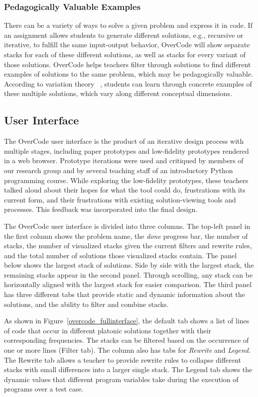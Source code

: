 \subsubsection{Pedagogically Valuable Examples} 
There can be a variety of ways to solve a given problem and express it in code. If an assignment allows students to generate different solutions, e.g., recursive or iterative, to fulfill the same input-output behavior, OverCode will show separate stacks for each of these different solutions, as well as stacks for every variant of those solutions. OverCode helps teachers filter through solutions to find different examples of solutions to the same problem, which may be pedagogically valuable. According to variation theory ~\cite{marton13}, students can learn through concrete examples of these multiple solutions, which vary along different conceptual dimensions.
\subsection{User Interface}

The OverCode user interface is the product of an iterative design process with multiple stages, including paper prototypes and low-fidelity prototypes rendered in a web browser.  Prototype iterations were used and critiqued by members of our research group and by several teaching staff of an introductory Python programming course. While exploring the low-fidelity prototypes, these teachers talked aloud about their hopes for what the tool could do, frustrations with its current form, and their frustrations with existing solution-viewing tools and processes. This feedback was incorporated into the final design.

The OverCode user interface is divided into three columns. The top-left panel in the first column shows the problem name, the \emph{done} progress bar, the number of stacks, the number of visualized stacks given the current filters and rewrite rules, and the total number of solutions those visualized stacks contain. The panel below shows the largest stack of solutions. Side by side with the largest stack, the remaining stacks appear in the second panel. Through scrolling, any stack can be horizontally aligned with the largest stack for easier comparison. The third panel has three different tabs that provide static and dynamic information about the solutions, and the ability to filter and combine stacks. 

As shown in Figure~\ref{overcode_fullinterface}, the default tab shows a list of lines of code that occur in different platonic solutions together with their corresponding frequencies. The stacks can be filtered based on the occurrence of one or more lines (Filter tab). The column also has tabs for \emph{Rewrite} and \emph{Legend}. The Rewrite tab allows a teacher to provide rewrite rules to collapse different stacks with small differences into a larger single stack. The Legend tab shows the dynamic values that different program variables take during the execution of programs over a test case. %

